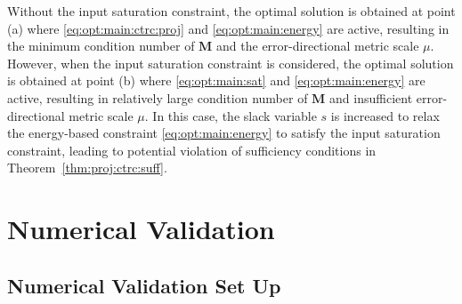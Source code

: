\documentclass{ifacconf}
\newcommand*{\mm}[1]{\boldsymbol{#1}} %
\begin{document}
Without the input saturation constraint, the optimal solution is obtained at point (a) where \eqref{eq:opt:main:ctrc:proj} and \eqref{eq:opt:main:energy} are active, resulting in the minimum condition number of $\mm{M}$ and the error-directional metric scale $\mu$.
However, when the input saturation constraint is considered, the optimal solution is obtained at point (b) where \eqref{eq:opt:main:sat} and \eqref{eq:opt:main:energy} are active, resulting in relatively large condition number of $\mm{M}$ and insufficient error-directional metric scale $\mu$.
In this case, the slack variable $s$ is increased to relax the energy-based constraint \eqref{eq:opt:main:energy} to satisfy the input saturation constraint, leading to potential violation of sufficiency conditions in Theorem~\ref{thm:proj:ctrc:suff}.

\section{Numerical Validation} \label{sec:validation}

\subsection{Numerical Validation Set Up}
\end{document}
